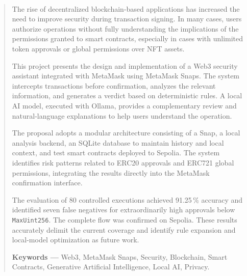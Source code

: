\newpage

\vspace{50pt}

{
    \paragraph{} %
    \begin{abstract}

        
        The rise of decentralized blockchain-based applications has increased the need to improve security during transaction signing. In many cases, users authorize operations without fully understanding the implications of the permissions granted to smart contracts, especially in cases with unlimited token approvals or global permissions over NFT assets.

        This project presents the design and implementation of a Web3 security assistant integrated with MetaMask using MetaMask Snaps. The system intercepts transactions before confirmation, analyzes the relevant information, and generates a verdict based on deterministic rules. A local AI model, executed with Ollama, provides a complementary review and natural-language explanations to help users understand the operation.
        
        The proposal adopts a modular architecture consisting of a Snap, a local analysis backend, an SQLite database to maintain history and local context, and test smart contracts deployed to Sepolia. The system identifies risk patterns related to ERC20 approvals and ERC721 global permissions, integrating the results directly into the MetaMask confirmation interface.

        The evaluation of 80 controlled executions achieved 91.25\,\% accuracy and identified seven false negatives for extraordinarily high approvals below \texttt{MaxUint256}. The complete flow was confirmed on Sepolia. These results accurately delimit the current coverage and identify rule expansion and local-model optimization as future work.

        \vspace{30pt}

        \textbf{Keywords — } Web3, MetaMask Snaps, Security, Blockchain, Smart Contracts, Generative Artificial Intelligence, Local AI, Privacy.

        
    \end{abstract}
}

\newpage
 
